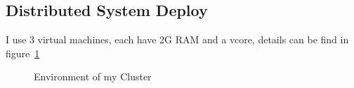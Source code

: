 \documentclass[12pt,a4paper]{scrartcl}
\begin{document}
	\subsection{Distributed System Deploy}
	I use 3 virtual machines, each have 2G RAM and a vcore, details can be find in figure~\ref{fig:environment}
	\begin{figure}[ht]
		\centering
		\caption{Environment of my Cluster}
		\label{fig:environment}
	\end{figure} 
\end{document}

